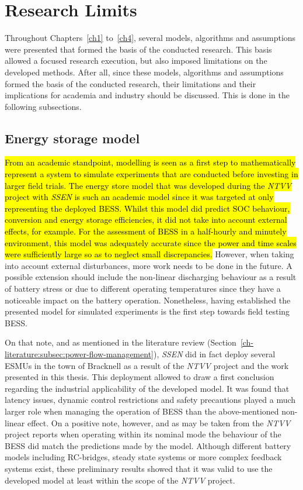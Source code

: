 \section{Research Limits}
\label{ch-conclusions:sec:research-limits}

Throughout Chapters~\ref{ch1} to~\ref{ch4}, several models, algorithms and assumptions were presented that formed the basis of the conducted research.
This basis allowed a focused research execution, but also imposed limitations on the developed methods.
After all, since these models, algorithms and assumptions formed the basis of the conducted research, their limitations and their implications for academia and industry should be discussed.
This is done in the following subsections.

\subsection{Energy storage model}

\hl{From an academic standpoint, modelling is seen as a first step to mathematically represent a system to simulate experiments that are conducted before investing in larger field trials.
The energy store model that was developed during the \textit{NTVV} project with \textit{SSEN} is such an academic model since it was targeted at only representing the deployed BESS.
Whilst this model did predict SOC behaviour, conversion and energy storage efficiencies, it did not take into account external effects, for example.
For the assessment of BESS in a half-hourly and minutely environment, this model was adequately accurate since the power and time scales were sufficiently large so as to neglect small discrepancies.}
However, when taking into account external disturbances, more work needs to be done in the future.
A possible extension should include the non-linear discharging behaviour as a result of battery stress or due to different operating temperatures since they have a noticeable impact on the battery operation.
Nonetheless, having established the presented model for simulated experiments is the first step towards field testing BESS.

On that note, and as mentioned in the literature review (Section~\ref{ch-literature:subsec:power-flow-management}), \textit{SSEN} did in fact deploy several ESMUs in the town of Bracknell as a result of the \textit{NTVV} project and the work presented in this thesis.
This deployment allowed to draw a first conclusion regarding the industrial applicability of the developed model.
It was found that latency issues, dynamic control restrictions and safety precautions played a much larger role when managing the operation of BESS than the above-mentioned non-linear effect.
On a positive note, however, and as may be taken from the \textit{NTVV} project reports \cite{NTVV9.8a} when operating within its nominal mode the behaviour of the BESS did match the predictions made by the model.
Although different battery models including RC-bridges, steady state systems or more complex feedback systems exist, these preliminary results showed that it was valid to use the developed model at least within the scope of the \textit{NTVV} project.

